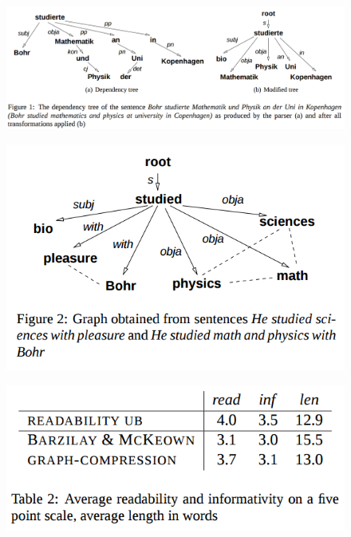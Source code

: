 \documentclass[xcolor={table}]{beamer}
\begin{document}
\begin{frame}[t]{\cite{filippova2008sentence}}
      \begin{figure}[h]
          \centering
      \includegraphics[scale=.25]{images/figure1-filippova08.png} \\
  \end{figure}
\end{frame}
\begin{frame}[t]{\cite{filippova2008sentence}}
      \begin{figure}[h]
          \centering
      \includegraphics[scale=.25]{images/figure2-filippova08.png} \\
  \end{figure}
\end{frame}
\begin{frame}[t]{\cite{filippova2008sentence}}
      \begin{figure}[h]
          \centering
      \includegraphics[scale=.25]{images/table2-filippova08.png} \\
  \end{figure}
\end{frame}
\end{document}
